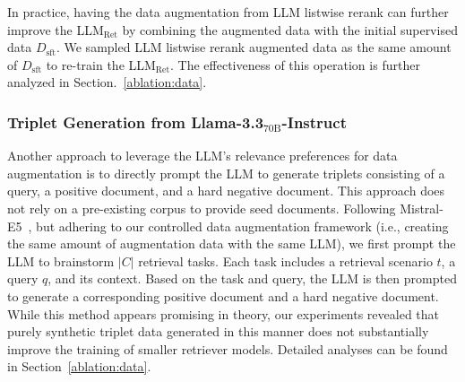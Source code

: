 \documentclass[]{fairmeta}
\begin{document}
In practice, having the data augmentation from LLM listwise rerank can further improve the LLM$_\text{Ret}$ by combining the augmented data with the initial supervised data $D_\text{sft}$.
We sampled LLM listwise rerank augmented data as the same amount of $D_\text{sft}$ to re-train the LLM$_\text{Ret}$.
The effectiveness of this operation is further analyzed in Section.~\ref{ablation:data}.

\subsubsection{Triplet Generation from \texorpdfstring{Llama-3.3$_\text{70B}$-Instruct}{Llama-3.3-70B-Instruct}}

Another approach to leverage the LLM's relevance preferences for data augmentation is to directly prompt the LLM to generate triplets consisting of a query, a positive document, and a hard negative document.
This approach does not rely on a pre-existing corpus to provide seed documents.
Following Mistral-E5~\citep{wang-etal-2024-improving-text}, but adhering to our controlled data augmentation framework (i.e., creating the same amount of augmentation data with the same LLM), we first prompt the LLM to brainstorm $|C|$ retrieval tasks.
Each task includes a retrieval scenario $t$, a query $q$, and its context.
Based on the task and query, the LLM is then prompted to generate a corresponding positive document and a hard negative document.
While this method appears promising in theory, our experiments revealed that purely synthetic triplet data generated in this manner does not substantially improve the training of smaller retriever models.
Detailed analyses can be found in Section~\ref{ablation:data}.
\end{document}
